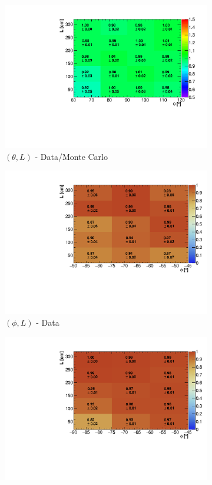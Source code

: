 \documentclass[a4paper,11pt]{article}
\begin{document}
\begin{figure}[htbp]
\begin{subfigure}{0.33\textwidth}
\includegraphics[width=\linewidth]{figures/theta_l.pdf}
\caption{$(\theta,L)$ - Data/Monte Carlo}
\end{subfigure}
\begin{subfigure}{0.33\textwidth}
  \includegraphics[width=\linewidth]{figures/e_phi_l.pdf}
  \caption{$(\phi,L)$ - Data}
\end{subfigure}\begin{subfigure}{0.33\textwidth}
\includegraphics[width=\linewidth]{figures/phi_l_mc.pdf}

\end{subfigure}
\end{figure}
\end{document}
